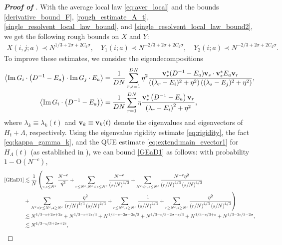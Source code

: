 \documentclass[10pt,reqno]{amsart}
\numberwithin{equation}{section}
\numberwithin{figure}{section}
\theoremstyle{plain} %
\theoremstyle{definition} %
\newcommand{\pa}[1]{\left({#1}\right)}
\newcommand{\avga}[1]{\left\langle #1 \right\rangle}
\DeclareMathOperator{\im}{\mathrm{Im}}
\newcommand{\bv}{{\bf{v}}}
\newcommand{\e}{{\varepsilon}}
\newcommand{\OO}{\mathrm{O}}
\numberwithin{equation}{section}
\begin{document}
\begin{proof}[\bf Proof of ]
With the average local law \eqref{eq:aver_local} and the bounds \eqref{derivative_bound_F}, \eqref{rough_estimate_A_t}, \eqref{single_resolvent_local_law_bound}, and  \eqref{single_resolvent_local_law_bound2}, %
we get the following rough bounds on $X$ and $Y$:
\begin{align}\label{eq:roughXY}
	X(i,j;a) \prec N^{1/3+2\sigma+2C_2\sigma},\quad 
	Y_1({i;a}) \prec N^{-2/3+2\sigma+2C_2\sigma},\quad
    Y_2({i;a}) \prec N^{-2/3+2\sigma+2C_2\sigma}.
\end{align}
To improve these estimates, we consider the eigendecompositions 
   \begin{align}
        \avga{\im G_i\cdot\pa{D^{-1}-E_a}\cdot\im G_j\cdot E_a} &=\frac{1}{DN}\sum_{r,s=1}^{DN}\eta^2 \frac{  {\bf v}_r^* (D^{-1}-E_a){\bf v}_s \cdot  {\bf v}_s^* E_a{\bf v}_r}
       {\pa{(\lambda_r-E_i)^2+\eta^2}\pa{(\lambda_s-E_j)^2+\eta^2}},\label{GEaD1}\\
        \avga{\im G_i\cdot\pa{D^{-1}-E_a}}
      & =\frac{1}{DN}\sum_{r=1}^{DN}\eta\frac{\bv_r^*\pa{D^{-1}-E_a}\bv_r}{\pa{\lambda_r-E_i}^2+\eta^2},\label{GEaD2}
   \end{align}
where $\lambda_k\equiv \lambda_k(t)$ and $\bv_k\equiv \bv_k(t)$ denote the eigenvalues and eigenvectors of $H_t + \Lambda$, respectively. Using the eigenvalue rigidity estimate \eqref{eq:rigidity}, the fact \eqref{eq:kappa_gamma_k}, and the QUE estimate \eqref{eq:extend:main_evector1} for ${H_{\Lambda}}(t)$ (as established in ), we can bound \eqref{GEaD1} as follows: with probability $1-\OO(N^{-c})$, 
\begin{align}
\eqref{GEaD1}
&\lesssim \frac{1}{N}\left(\sum_{r,s\le N^\e} \frac{N^{-c} }{\eta^2} +\sum_{r\le N^\e, N^\e < s\le N^c} \frac{N^{-c} }{\pa{s/N}^{4/3}} + \sum_{N^\e < r, s\le N^c} \frac{N^{-c} \eta^2}{\pa{r/N}^{4/3}\pa{s/N}^{4/3}}\right. \nonumber\\
&    +\left. \sum_{N^\e < r\le N^c,s\ge N^{c}}\frac{\eta^2}{\pa{r/N}^{4/3}\pa{s/N}^{4/3}}+\sum_{r\le N^\e,s\ge N^{c}}\frac{1}{\pa{s/N}^{4/3}} +\sum_{r\ge N^c,s\ge N^{c}}\frac{\eta^2}{\pa{r/N}^{4/3}\pa{s/N}^{4/3}}\right)\nonumber \\
&\lesssim N^{1/3-c+2\sigma+2\e}+N^{1/3-c+2\varepsilon/3}+N^{1/3-c-2\sigma-2\varepsilon/3}+N^{1/3-c/3-2\sigma-\varepsilon/3}+N^{1/3-c/3+\varepsilon}+N^{1/3-2c/3-2\sigma},\nonumber\\
&    \lesssim N^{1/3-c/3+2\sigma+2\varepsilon},\label{GEaD3}
\end{align}

\end{proof}
\end{document}
